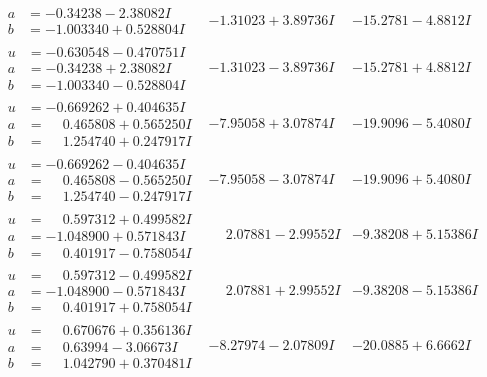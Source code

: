 \documentclass[1p]{elsarticle_modified}
\theoremstyle{definition}
\begin{document}
$$\begin{array}{c|c|c}
\begin{aligned}
a &= -0.34238 - 2.38082 I \\
b &= -1.003340 + 0.528804 I\end{aligned}
 & -1.31023 + 3.89736 I & -15.2781 - 4.8812 I \\ \hline\begin{aligned}
u &= -0.630548 - 0.470751 I \\
a &= -0.34238 + 2.38082 I \\
b &= -1.003340 - 0.528804 I\end{aligned}
 & -1.31023 - 3.89736 I & -15.2781 + 4.8812 I \\ \hline\begin{aligned}
u &= -0.669262 + 0.404635 I \\
a &= \phantom{-}0.465808 + 0.565250 I \\
b &= \phantom{-}1.254740 + 0.247917 I\end{aligned}
 & -7.95058 + 3.07874 I & -19.9096 - 5.4080 I \\ \hline\begin{aligned}
u &= -0.669262 - 0.404635 I \\
a &= \phantom{-}0.465808 - 0.565250 I \\
b &= \phantom{-}1.254740 - 0.247917 I\end{aligned}
 & -7.95058 - 3.07874 I & -19.9096 + 5.4080 I \\ \hline\begin{aligned}
u &= \phantom{-}0.597312 + 0.499582 I \\
a &= -1.048900 + 0.571843 I \\
b &= \phantom{-}0.401917 - 0.758054 I\end{aligned}
 & \phantom{-}2.07881 - 2.99552 I & -9.38208 + 5.15386 I \\ \hline\begin{aligned}
u &= \phantom{-}0.597312 - 0.499582 I \\
a &= -1.048900 - 0.571843 I \\
b &= \phantom{-}0.401917 + 0.758054 I\end{aligned}
 & \phantom{-}2.07881 + 2.99552 I & -9.38208 - 5.15386 I \\ \hline\begin{aligned}
u &= \phantom{-}0.670676 + 0.356136 I \\
a &= \phantom{-}0.63994 - 3.06673 I \\
b &= \phantom{-}1.042790 + 0.370481 I\end{aligned}
 & -8.27974 - 2.07809 I & -20.0885 + 6.6662 I \\ \hline\begin{aligned}

\end{aligned}
\end{array}$$
\end{document}
